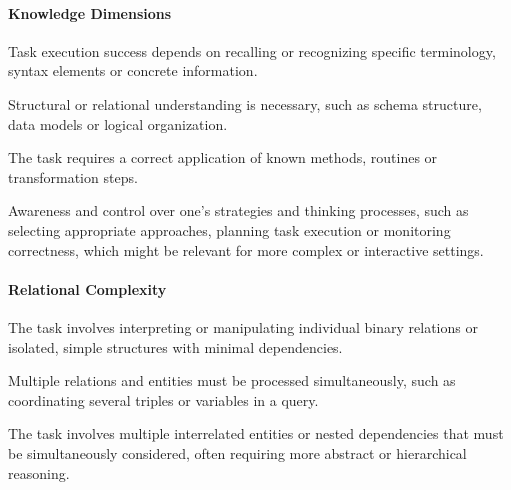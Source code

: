 \documentclass[
]{ceurart}
\begin{document}
\paragraph{Knowledge Dimensions}
\begin{description}[style=multiline, leftmargin=25mm, font=\normalfont\itshape, parsep=0pt, itemsep=1pt]
    \item[Factual] Task execution success depends on recalling or recognizing specific terminology, syntax elements or concrete information. 
    \item[Conceptual] Structural or relational understanding is necessary, such as schema structure, data models or logical organization. 
    \item[Procedural] The task requires a correct application of known methods, routines or transformation steps. 
    \item[Metacognitive] Awareness and control over one's strategies and thinking processes, such as selecting appropriate approaches, planning task execution or monitoring correctness, which might be relevant for more complex or interactive settings.
\end{description}


\paragraph{Relational Complexity}
\begin{description}[style=multiline, leftmargin=25mm, font=\normalfont\itshape, parsep=0pt, itemsep=1pt]
    \item[Low] The task involves interpreting or manipulating individual binary relations or isolated, simple structures with minimal dependencies. 
    \item[Medium] Multiple relations and entities must be processed simultaneously, such as coordinating several triples or variables in a query. 
    \item[High] The task involves multiple interrelated entities or nested dependencies that must be simultaneously considered, often requiring more abstract or hierarchical reasoning.
\end{description}
\end{document}
